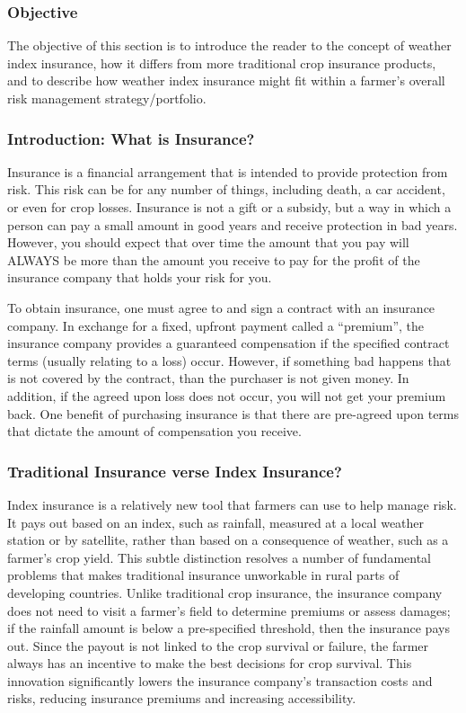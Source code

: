 \documentclass[letterpaper,10pt,english]{sphinxmanual}
\begin{document}
\subsubsection{Objective}
\label{whatisindexinsurance/weather/weatherindexinsurance_en:objective}
The objective of this section is to introduce the reader to the concept of weather index insurance, how it differs from more traditional crop insurance products, and to describe how weather index insurance might fit within a farmer's overall risk management strategy/portfolio.


\subsubsection{Introduction: What is Insurance?}
\label{whatisindexinsurance/weather/weatherindexinsurance_en:introduction-what-is-insurance}
Insurance is a financial arrangement that is intended to provide protection from risk. This risk can be for any number of things, including death, a car accident, or even for crop losses. Insurance is not a gift or a subsidy, but a way in which a person can pay a small amount in good years and receive protection in bad years. However, you should expect that over time the amount that you pay will ALWAYS be more than the amount you receive to pay for the profit of the insurance company that holds your risk for you.

To obtain insurance, one must agree to and sign a contract with an insurance company. In exchange for a fixed, upfront payment called a ``premium'', the insurance company provides a guaranteed compensation if the specified contract terms (usually relating to a loss) occur. However, if something bad happens that is not covered by the contract, than the purchaser is not given money. In addition, if the agreed upon loss does not occur, you will not get your premium back. One benefit of purchasing insurance is that there are pre-agreed upon terms that dictate the amount of compensation you receive.


\subsubsection{Traditional Insurance verse Index Insurance?}
\label{whatisindexinsurance/weather/weatherindexinsurance_en:traditional-insurance-verse-index-insurance}
Index insurance is a relatively new tool that farmers can use to help manage risk. It pays out based on an index, such as rainfall, measured at a local weather station or by satellite, rather than based on a consequence of weather, such as a farmer's crop yield. This subtle distinction resolves a number of fundamental problems that makes traditional insurance unworkable in rural parts of developing countries. Unlike traditional crop insurance, the insurance company does not need to visit a farmer's field to determine premiums or assess damages; if the rainfall amount is below a pre-specified threshold, then the insurance pays out. Since the payout is not linked to the crop survival or failure, the farmer always has an incentive to make the best decisions for crop survival. This innovation significantly lowers the insurance company's transaction costs and risks, reducing insurance premiums and increasing accessibility.
\end{document}
